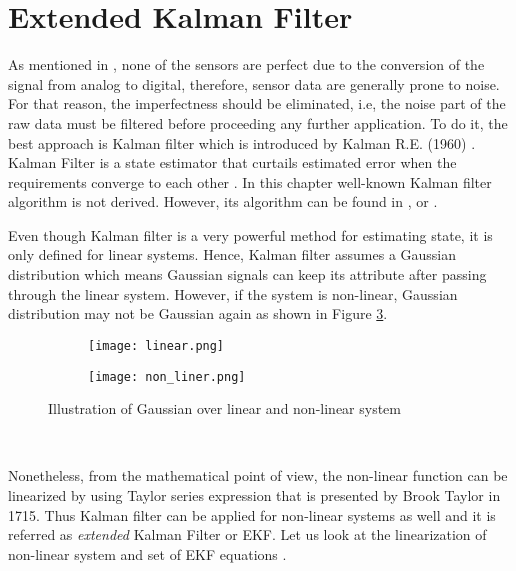 \section{Extended Kalman Filter}\label{ekf}
As mentioned in \cite{noise}, none of the sensors are perfect due to the conversion of the signal from analog to digital, therefore, sensor data are generally prone to noise. For that reason, the imperfectness should be eliminated, i.e, the noise part of the raw data must be filtered before proceeding any further application. To do it, the best approach is Kalman filter which is introduced by Kalman R.E. (1960) \cite{kalman}. Kalman Filter is a state estimator that curtails estimated error when the requirements converge to each other \cite{kalman1}. In this chapter well-known Kalman filter algorithm is not derived. However, its algorithm can be found in \cite{kalman}, \cite{kalman1} or \cite{kalman2}.
\\ 
\par Even though Kalman filter is a very powerful method for estimating state, it is only defined for linear systems. Hence, Kalman filter assumes a Gaussian distribution which means Gaussian signals can keep its attribute after passing through the linear system. However, if the system is non-linear, Gaussian distribution may not be Gaussian again as shown in Figure \ref{fig:Gaussion}.
\begin{figure}[h!]
    \centering
    \begin{subfigure}{.5\textheight}
        \texttt{[image: linear.png]}
        \label{fig:linear}
    \end{subfigure}
    \begin{subfigure}{.5\textheight}
        \texttt{[image: non\_liner.png]}
        \label{fig:non-linear}
    \end{subfigure}
    \caption{Illustration of Gaussian over linear and non-linear system}
    \label{fig:Gaussion}

\end{figure}
\\
\par Nonetheless, from the mathematical point of view, the non-linear function can be linearized by using Taylor series expression %
that is presented by  Brook Taylor in 1715. 
Thus Kalman filter can be applied for non-linear systems as well and it is referred as \textit{extended} Kalman Filter or EKF. Let us look at the linearization of non-linear system and set of EKF equations \cite{kalman3}.

